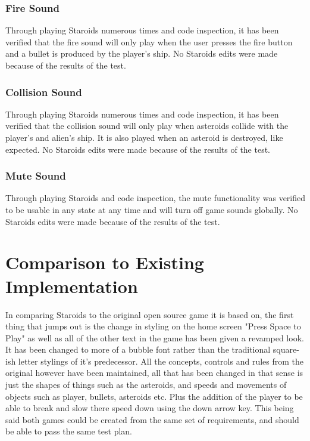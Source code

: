 \documentclass[12pt, titlepage]{article}
\begin{document}
\subsubsection{Fire Sound}
Through playing Staroids numerous times and code inspection, it has been verified that the fire sound will only play when the user presses the fire button and a bullet is produced by the player's ship. No Staroids edits were made because of the results of the test.
\subsubsection{Collision Sound}
Through playing Staroids numerous times and code inspection, it has been verified that the collision sound will only play when asteroids collide with the player's and alien's ship. It is also played when an asteroid is destroyed, like expected. No Staroids edits were made because of the results of the test.
\subsubsection{Mute Sound}
Through playing Staroids and code inspection, the mute functionality was verified to be usable in any state at any time and will turn off game sounds globally. No Staroids edits were made because of the results of the test.

\section{Comparison to Existing Implementation}

In comparing Staroids to the original open source game it is based on, the first thing that jumps out is the change in styling on the home screen "Press Space to Play" as well as all of the other text in the game has been given a revamped look. It has been changed to more of a bubble font rather than the traditional square-ish letter stylings of it's predecessor. All the concepts, controls and rules from the original however have been maintained, all that has been changed in that sense is just the shapes of things such as the asteroids, and speeds and movements of objects such as player, bullets, asteroids etc. Plus the addition of the player to be able to break and slow there speed down using the down arrow key. This being said both games could be created from the same set of requirements, and should be able to pass the same test plan.
\end{document}
